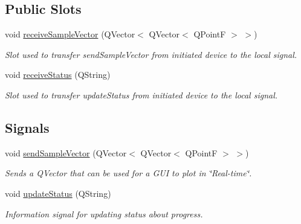 \subsection*{Public Slots}
\begin{DoxyCompactItemize}
\item 
void \hyperlink{classDeviceManager_a14f86d572f6ea7222032ec00499a16a8}{receive\+Sample\+Vector} (Q\+Vector$<$ Q\+Vector$<$ Q\+PointF $>$ $>$)
\begin{DoxyCompactList}\small\item\em Slot used to transfer send\+Sample\+Vector from initiated device to the local signal. \end{DoxyCompactList}\item 
void \hyperlink{classDeviceManager_aa7b96de52a17b961688e81f5e999da74}{receive\+Status} (Q\+String)
\begin{DoxyCompactList}\small\item\em Slot used to transfer update\+Status from initiated device to the local signal. \end{DoxyCompactList}\end{DoxyCompactItemize}
\subsection*{Signals}
\begin{DoxyCompactItemize}
\item 
void \hyperlink{classDeviceManager_a7f0794801ee0b28c74a253f3c2cf5659}{send\+Sample\+Vector} (Q\+Vector$<$ Q\+Vector$<$ Q\+PointF $>$ $>$)
\begin{DoxyCompactList}\small\item\em Sends a Q\+Vector that can be used for a G\+UI to plot in \char`\"{}\+Real-\/time\char`\"{}. \end{DoxyCompactList}\item 
void \hyperlink{classDeviceManager_a68b6e3b924cacf0a5cde44d02eb49d0c}{update\+Status} (Q\+String)
\begin{DoxyCompactList}\small\item\em Information signal for updating status about progress. \end{DoxyCompactList}\end{DoxyCompactItemize}
